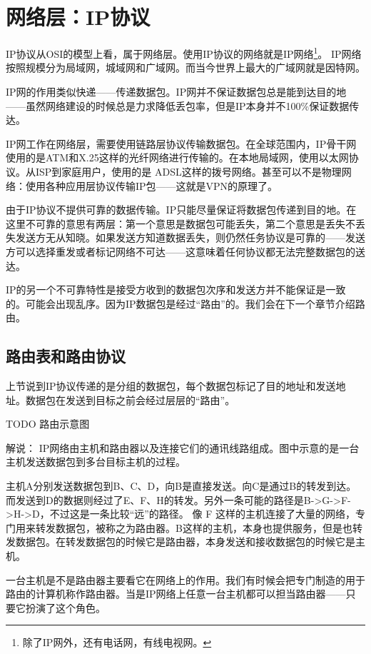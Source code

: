 \section{网络层：IP协议}

IP协议从OSI的模型上看，属于网络层。使用IP协议的网络就是IP网络\footnote{除了IP网外，还有电话网，有线电视网。}。
IP网络按照规模分为局域网，城域网和广域网。而当今世界上最大的广域网就是因特网。

IP网的作用类似快递——传递数据包。IP网并不保证数据包总是能到达目的地——虽然网络建设的时候总是力求降低丢包率，但是IP本身并不100\%保证数据传达。

IP网工作在网络层，需要使用链路层协议传输数据包。在全球范围内，IP骨干网使用的是ATM和X.25这样的光纤网络进行传输的。在本地局域网，使用以太网协议。从ISP到家庭用户，使用的是
ADSL这样的拨号网络。甚至可以不是物理网络：使用各种应用层协议传输IP包——这就是VPN的原理了。

由于IP协议不提供可靠的数据传输。IP只能尽量保证将数据包传递到目的地。在这里不可靠的意思有两层：第一个意思是数据包可能丢失，第二个意思是丢失不丢失发送方无从知晓。如果发送方知道数据丢失，则仍然任务协议是可靠的——发送方可以选择重发或者标记网络不可达——这意味着任何协议都无法完整数据包的送达。

IP的另一个不可靠特性是接受方收到的数据包次序和发送方并不能保证是一致的。可能会出现乱序。因为IP数据包是经过“路由”的。我们会在下一个章节介绍路由。

\subsection{路由表和路由协议}

上节说到IP协议传递的是分组的数据包，每个数据包标记了目的地址和发送地址。数据包在发送到目标之前会经过层层的“路由”。

TODO 路由示意图

解说： IP网络由主机和路由器以及连接它们的通讯线路组成。图中示意的是一台主机发送数据包到多台目标主机的过程。

主机A分别发送数据包到B、C、D，向B是直接发送。向C是通过B的转发到达。而发送到D的数据则经过了E、F、H的转发。另外一条可能的路径是B->G->F->H->D，不过这是一条比较“远”的路径。
像 F 这样的主机连接了大量的网络，专门用来转发数据包，被称之为路由器。B这样的主机，本身也提供服务，但是也转发数据包。在转发数据包的时候它是路由器，本身发送和接收数据包的时候它是主机。

一台主机是不是路由器主要看它在网络上的作用。我们有时候会把专门制造的用于路由的计算机称作路由器。当是IP网络上任意一台主机都可以担当路由器——只要它扮演了这个角色。


